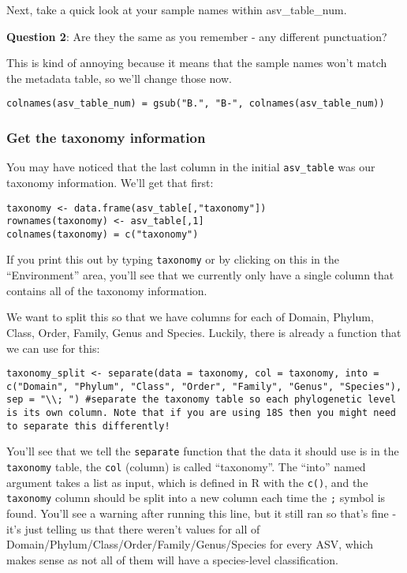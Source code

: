 \documentclass[
]{book}
\begin{document}
Next, take a quick look at your sample names within asv\_table\_num.

\textbf{Question 2}: Are they the same as you remember - any different punctuation?

This is kind of annoying because it means that the sample names won't match the metadata table, so we'll change those now.

\begin{verbatim}
colnames(asv_table_num) = gsub("B.", "B-", colnames(asv_table_num))
\end{verbatim}

\subsubsection{Get the taxonomy information}\label{get-the-taxonomy-information}

You may have noticed that the last column in the initial \texttt{asv\_table} was our taxonomy information. We'll get that first:

\begin{verbatim}
taxonomy <- data.frame(asv_table[,"taxonomy"])
rownames(taxonomy) <- asv_table[,1]
colnames(taxonomy) = c("taxonomy")
\end{verbatim}

If you print this out by typing \texttt{taxonomy} or by clicking on this in the ``Environment'' area, you'll see that we currently only have a single column that contains all of the taxonomy information.

We want to split this so that we have columns for each of Domain, Phylum, Class, Order, Family, Genus and Species. Luckily, there is already a function that we can use for this:

\begin{verbatim}
taxonomy_split <- separate(data = taxonomy, col = taxonomy, into = c("Domain", "Phylum", "Class", "Order", "Family", "Genus", "Species"), sep = "\\; ") #separate the taxonomy table so each phylogenetic level is its own column. Note that if you are using 18S then you might need to separate this differently!
\end{verbatim}

You'll see that we tell the \texttt{separate} function that the data it should use is in the \texttt{taxonomy} table, the \texttt{col} (column) is called ``taxonomy''. The ``into'' named argument takes a list as input, which is defined in R with the \texttt{c()}, and the \texttt{taxonomy} column should be split into a new column each time the \texttt{;} symbol is found. You'll see a warning after running this line, but it still ran so that's fine - it's just telling us that there weren't values for all of Domain/Phylum/Class/Order/Family/Genus/Species for every ASV, which makes sense as not all of them will have a species-level classification.
\end{document}
